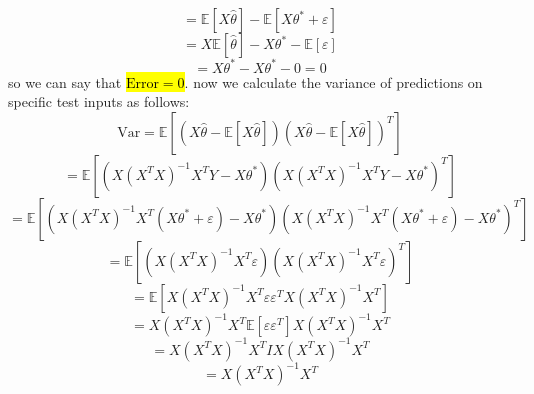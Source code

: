 \begin{qsolve}
\begin{qsolve}[]
		$$
		= \mathbb{E}\left[X\hat{\theta}\right] - \mathbb{E}\left[X\theta^* + \varepsilon\right]
		$$
		$$
		= X\mathbb{E}\left[\hat{\theta}\right] - X\theta^* - \mathbb{E}\left[\varepsilon\right]
		$$
		$$
		= X\theta^* - X\theta^* - 0 = 0
		$$
		so we can say that \hl{$\text{Error} = 0$}. now we calculate the variance of predictions on specific test inputs as follows:
		$$
		\text{Var} = \mathbb{E}\left[ (X\hat{\theta} - \mathbb{E}\left[X\hat{\theta}\right])(X\hat{\theta} - \mathbb{E}\left[X\hat{\theta}\right])^T \right]
		$$
		$$
		= \mathbb{E}\left[ (X(X^T X)^{-1} X^T Y - X\theta^*)(X(X^T X)^{-1} X^T Y - X\theta^*)^T \right]
		$$
		$$
		= \mathbb{E}\left[ (X(X^T X)^{-1} X^T (X\theta^* + \varepsilon) - X\theta^*)(X(X^T X)^{-1} X^T (X\theta^* + \varepsilon) - X\theta^*)^T \right]
		$$
		$$
		= \mathbb{E}\left[ (X(X^T X)^{-1} X^T \varepsilon)(X(X^T X)^{-1} X^T \varepsilon)^T \right]
		$$
		$$
		= \mathbb{E}\left[ X(X^T X)^{-1} X^T \varepsilon \varepsilon^T X(X^T X)^{-1} X^T \right]
		$$
		$$
		= X(X^T X)^{-1} X^T \mathbb{E}\left[ \varepsilon \varepsilon^T \right] X(X^T X)^{-1} X^T
		$$
		$$
		= X(X^T X)^{-1} X^T  I X(X^T X)^{-1} X^T
		$$
		$$
		=  X(X^T X)^{-1} X^T
		$$
		
		\end{qsolve}
\end{qsolve}